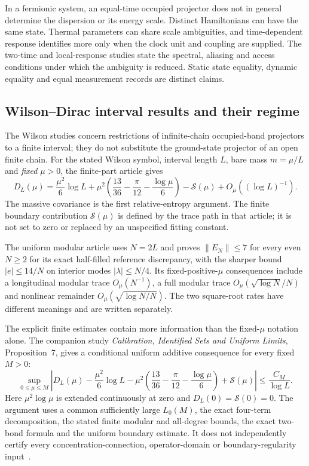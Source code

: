 In a fermionic system, an equal-time occupied projector does not in general determine the dispersion or its energy scale. Distinct Hamiltonians can have the same state. Thermal parameters can share scale ambiguities, and time-dependent response identifies more only when the clock unit and coupling are supplied. The two-time and local-response studies state the spectral, aliasing and access conditions under which the ambiguity is reduced. Static state equality, dynamic equality and equal measurement records are distinct claims.

\subsection{Wilson--Dirac interval results and their regime}

The Wilson studies concern restrictions of infinite-chain occupied-band projectors to a finite interval; they do not substitute the ground-state projector of an open finite chain. For the stated Wilson symbol, interval length $L$, bare mass $m=\mu/L$ and \emph{fixed} $\mu>0$, the finite-part article gives
\[
 D_L(\mu)=\frac{\mu^2}{6}\log L+
 \mu^2\left(\frac{13}{36}-\frac{\pi}{12}-\frac{\log\mu}{6}\right)
 -\mathcal S(\mu)+O_\mu((\log L)^{-1}).
\]
The massive covariance is the first relative-entropy argument. The finite boundary contribution $\mathcal S(\mu)$ is defined by the trace path in that article; it is not set to zero or replaced by an unspecified fitting constant.

The uniform modular article uses $N=2L$ and proves $\|E_N\|\le7$ for every even $N\ge2$ for its exact half-filled reference discrepancy, with the sharper bound $|e|\le14/N$ on interior modes $|\lambda|\le N/4$. Its fixed-positive-$\mu$ consequences include a longitudinal modular trace $O_\mu(N^{-1})$, a full modular trace $O_\mu(\sqrt{\log N}/N)$ and nonlinear remainder $O_\mu(\sqrt{\log N/N})$. The two square-root rates have different meanings and are written separately.

The explicit finite estimates contain more information than the fixed-$\mu$ notation alone. The companion study \emph{Calibration, Identified Sets and Uniform Limits}, Proposition~7, gives a conditional uniform additive consequence for every fixed $M>0$:
\[
 \sup_{0\le\mu\le M}\left|D_L(\mu)-\frac{\mu^2}{6}\log L
 -\mu^2\left(\frac{13}{36}-\frac\pi{12}-\frac{\log\mu}{6}\right)
 +\mathcal S(\mu)\right|\le\frac{C_M}{\log L}.
\]
Here $\mu^2\log\mu$ is extended continuously at zero and $D_L(0)=\mathcal S(0)=0$. The argument uses a common sufficiently large $L_0(M)$, the exact four-term decomposition, the stated finite modular and all-degree bounds, the exact two-bond formula and the uniform boundary estimate. It does not independently certify every concentration-connection, operator-domain or boundary-regularity input~\cite{justusJoint}.

